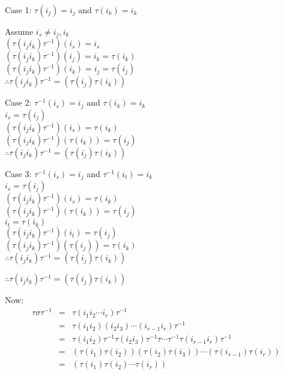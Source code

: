 \documentclass[letterpaper,12pt,fleqn]{article}
\renewcommand{\o}{\sigma}
\renewcommand{\t}{\tau}
\begin{document}
\begin{description}
\item Case 1: $\t(i_j)=i_j$ and $\t(i_k)=i_k$

  Assume $i_s\ne i_j,i_k$ \\
  $(\t(i_ji_k)\t^{-1})(i_s)=i_s$ \\
  $(\t(i_ji_k)\t^{-1})(i_j)=i_k=\t(i_k)$ \\
  $(\t(i_ji_k)\t^{-1})(i_k)=i_j=\t(i_j)$ \\
  $\therefore \t(i_ji_k)\t^{-1}=(\t(i_j)\t(i_k))$

\item Case 2: $\t^{-1}(i_s)=i_j$ and $\t(i_k)=i_k$ \\
  $i_s=\t(i_j)$ \\
  $(\t(i_ji_k)\t^{-1})(i_s)=\t(i_k)$ \\
  $(\t(i_ji_k)\t^{-1})(\t(i_k))=\t(i_j)$ \\
  $\therefore \t(i_ji_k)\t^{-1}=(\t(i_j)\t(i_k))$

\item Case 3: $\t^{-1}(i_s)=i_j$ and $\t^{-1}(i_t)=i_k$ \\
  $i_s=\t(i_j)$ \\
  $(\t(i_ji_k)\t^{-1})(i_s)=\t(i_k)$ \\
  $(\t(i_ji_k)\t^{-1})(\t(i_k))=\t(i_j)$ \\
  $i_t=\t(i_k)$ \\
  $(\t(i_ji_k)\t^{-1})(i_t)=\t(i_j)$ \\
  $(\t(i_ji_k)\t^{-1})(\t(i_j))=\t(i_k)$ \\
  $\therefore \t(i_ji_k)\t^{-1}=(\t(i_j)\t(i_k))$
\end{description}

$\therefore \t(i_ji_k)\t^{-1}=(\t(i_j)\t(i_k))$

Now:
\begin{eqnarray*}
  \t\o\t^{-1} &=& \t(i_1i_2\cdots i_r)\t^{-1} \\
  &=& \t(i_1i_2)(i_2i_3)\cdots(i_{r-1}i_r)\t^{-1} \\
  &=& \t(i_1i_2)\t^{-1}\t(i_2i_3)\t^{-1}\t\cdots\t^{-1}\t(i_{r-1}i_r)\t^{-1} \\
  &=& (\t(i_1)\t(i_2))(\t(i_2)\t(i_3))\cdots(\t(i_{r-1})\t(i_r)) \\
  &=& (\t(i_1)\t(i_2)\cdots\t(i_r))
\end{eqnarray*}
\end{document}
